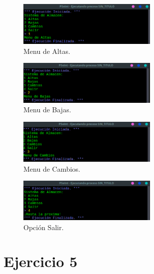 \documentclass[11pt, a4paper]{report}
\begin{document}
\begin{figure}[!ht]
\begin{center}
  \includegraphics[width=0.6\textwidth]{respuesta10.png}
  \caption{Menu de Altas.}
\end{center}
\end{figure}

\begin{figure}[!ht]
\begin{center}
  \includegraphics[width=0.6\textwidth]{respuesta11.png}
  \caption{Menu de Bajas.}
\end{center}
\end{figure} 

\begin{figure}[!ht]
\begin{center}
  \includegraphics[width=0.6\textwidth]{respuesta12.png}
  \caption{Menu de Cambios.}
\end{center}
\end{figure} 

\begin{figure}[!ht]
\begin{center}
  \includegraphics[width=0.6\textwidth]{respuesta13.png}
  \caption{Opci\'on Salir.}
\end{center}
\end{figure} 

\newpage
\section*{Ejercicio 5}
\end{document}
